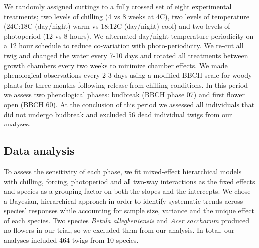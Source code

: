 \documentclass[11pt]{article}
\begin{document}
\noindent We randomly assigned cuttings to a fully crossed set of eight experimental treatments; two levels of chilling (4 vs 8 weeks at 4\degree C), two levels of temperature (24\degree C:18\degree C (day/night) warm vs 18\degree:12\degree C (day/night) cool) and two levels of photoperiod (12 vs 8 hours). We alternated day/night temperature periodicity on a 12 hour schedule to reduce co-variation with photo-periodicity. We re-cut all twig and changed the water every 7-10 days and rotated all treatments between growth chambers every two weeks to minimize chamber effects. We made phenological observations every 2-3 days using a modified BBCH scale for woody plants \citep{Finn2007} for three months following release from chilling conditions. In this period we assess two phenological phases: budbreak (BBCH phase 07) %
and first flower open (BBCH 60). At the conclusion of this period we assessed all individuals that did not undergo budbreak and excluded 56 dead individual twigs from our analyses. %

\subsection*{Data analysis}
\noindent To assess the sensitivity of each phase, we fit mixed-effect hierarchical models with chilling, forcing, photoperiod and all two-way interactions as the fixed effects and species as a grouping factor on both the slopes and the intercepts. We chose a Bayesian, hierarchical approach in order to identify systematic trends across species' responses while accounting for sample size, variance and the unique effect of each species. Two species \textit{Betula allegheniensis} and \textit{Acer saccharum} produced no flowers in our trial, so we excluded them from our analysis. In total, our analyses included 464 twigs from 10 species. \\

\end{document}
